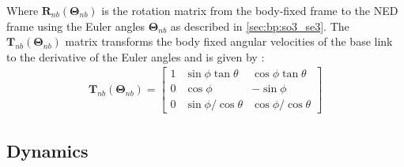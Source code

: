 Where $\bm{R}_{nb}(\bm{\Theta}_{nb})$ is the rotation matrix from the body-fixed frame to the NED frame
using the Euler angles $\bm{\Theta}_{nb}$ as described in \autoref{sec:bp:so3_se3}.
The $\bm{T}_{nb}(\bm{\Theta}_{nb})$ matrix transforms the body fixed angular velocities
of the base link to the derivative of the Euler angles and is given by \cite{fossen2021}:
\begin{align}
    \bm{T}_{nb}(\bm{\Theta}_{nb}) = \begin{bmatrix}
        1 & \sin\phi \tan\theta & \cos \phi \tan \theta \\
        0 & \cos \phi & -\sin\phi \\
        0 & \sin \phi / \cos \theta & \cos \phi / \cos \theta
    \end{bmatrix}
\end{align}

\subsection{Dynamics}


